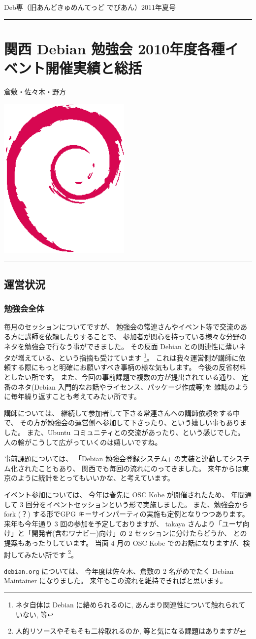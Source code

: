 \documentclass[mingoth,a4paper]{jsarticle}
\renewcommand{\dancersection}[2]{%
\newpage
Deb専（旧あんどきゅめんてっど でびあん）2011年夏号
%
\vspace{0.1mm}\\
{\color{dancerdarkblue}\rule{\hsize}{2mm}}

%
%
\begin{minipage}[t]{0.6\hsize}
\color{dancerdarkblue}
\vspace{1cm}
\section{#1}
\hfill{}#2\\
\end{minipage}
\begin{minipage}[t]{0.4\hsize}
\vspace{-2cm}
\hfill{}\includegraphics[height=8cm]{image200502/openlogo-nd.eps}\\
\vspace{-5cm}
\end{minipage}
%
{\color{dancerlightblue}\rule{0.66\hsize}{2mm}}
%
\vspace{2cm}
}
\begin{document}
\dancersection{関西 Debian 勉強会 2010年度各種イベント開催実績と総括}{倉敷・佐々木・野方}
\subsection{運営状況}

\subsubsection{勉強会全体}

毎月のセッションについてですが、 %
勉強会の常連さんやイベント等で交流のある方に講師を依頼したりすることで、 %
参加者が関心を持っている様々な分野のネタを勉強会で行なう事ができました。
その反面 Debian との関連性に薄いネタが増えている、という指摘も受けています
\footnote{ネタ自体は Debian に絡められるのに, あんまり関連性について触れられていない, 等}。%
これは我々運営側が講師に依頼する際にもっと明確にお願いすべき事柄の様な気もします。%
今後の反省材料としたい所です。
また、今回の事前課題で複数の方が提出されている通り、%
定番のネタ(Debian 入門的なお話やライセンス、パッケージ作成等)を%
雑誌のように毎年繰り返すことも考えてみたい所です。

講師については、%
継続して参加者して下さる常連さんへの講師依頼をする中で、%
その方が勉強会の運営側へ参加して下さったり、という嬉しい事もありました。
また、Ubuntu コミュニティとの交流があったり、という感じでした。
人の輪がこうして広がっていくのは嬉しいですね。

事前課題については、%
「Debian 勉強会登録システム」の実装と連動してシステム化されたこともあり、%
関西でも毎回の流れにのってきました。%
来年からは東京のように統計をとってもいいかな、と考えています。

イベント参加については、%
今年は春先に OSC Kobe が開催されたため、%
年間通して 3 回分をイベントセッションという形で実施しました。
%
また、勉強会から fork (？) する形でGPG キーサインパーティの実施も定例となりつつあります。
来年も今年通り 3 回の参加を予定しておりますが、%
takaya さんより「ユーザ向け」と「開発者(含むワナビー)向け」の 2 セッションに分けたらどうか、%
との提案もあったりしています。%
当面 4 月の OSC Kobe でのお話になりますが、検討してみたい所です%
\footnote{人的リソースやそもそも二枠取れるのか, 等と気になる課題はありますが}。

{\tt{debian.org}} については、
今年度は佐々木、倉敷の 2 名がめでたく Debian Maintainer になりました。
来年もこの流れを維持できればと思います。
\end{document}
